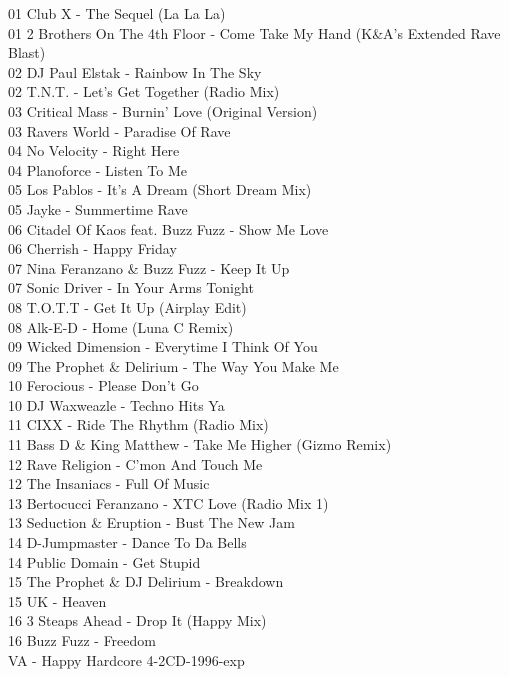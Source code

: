 \begin{multicols}{2}
 01 Club X - The Sequel (La La La)\\ 01 2 Brothers On The 4th Floor - Come Take My Hand (K\&A's Extended Rave Blast)\\ 02 DJ Paul Elstak - Rainbow In The Sky\\ 02 T.N.T. - Let's Get Together (Radio Mix)\\ 03 Critical Mass - Burnin' Love (Original Version)\\ 03 Ravers World - Paradise Of Rave\\ 04 No Velocity - Right Here\\ 04 Planoforce - Listen To Me\\ 05 Los Pablos - It's A Dream (Short Dream Mix)\\ 05 Jayke - Summertime Rave\\ 06 Citadel Of Kaos feat. Buzz Fuzz - Show Me Love\\ 06 Cherrish - Happy Friday\\ 07 Nina Feranzano \& Buzz Fuzz - Keep It Up\\ 07 Sonic Driver - In Your Arms Tonight\\ 08 T.O.T.T - Get It Up (Airplay Edit)\\ 08 Alk-E-D - Home (Luna C Remix)\\ 09 Wicked Dimension - Everytime I Think Of You\\ 09 The Prophet \& Delirium - The Way You Make Me\\ 10 Ferocious - Please Don't Go\\ 10 DJ Waxweazle - Techno Hits Ya\\ 11 CIXX - Ride The Rhythm (Radio Mix)\\ 11 Bass D \& King Matthew - Take Me Higher (Gizmo Remix)\\ 12 Rave Religion - C'mon And Touch Me\\ 12 The Insaniacs - Full Of Music\\ 13 Bertocucci Feranzano - XTC Love (Radio Mix 1)\\ 13 Seduction \& Eruption - Bust The New Jam\\ 14 D-Jumpmaster - Dance To Da Bells\\ 14 Public Domain - Get Stupid\\ 15 The Prophet \& DJ Delirium - Breakdown\\ 15 UK - Heaven\\ 16 3 Steaps Ahead - Drop It (Happy Mix)\\ 16 Buzz Fuzz - Freedom\\
 \large VA - Happy Hardcore 4-2CD-1996-exp \normalsize\\

\end{multicols}
